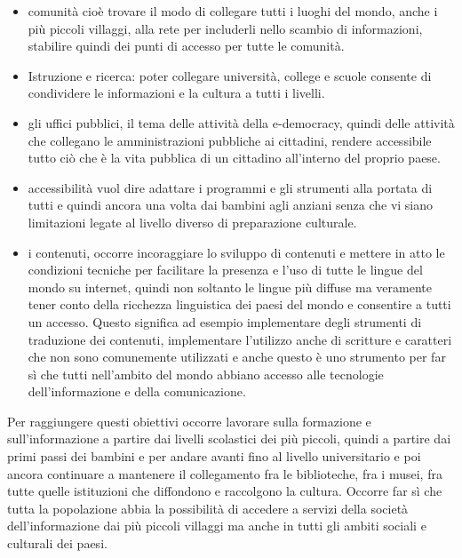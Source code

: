 \begin{itemize}
    \item comunità cioè trovare il modo di collegare tutti i luoghi del mondo, anche i più piccoli villaggi, alla rete per includerli nello scambio di informazioni, stabilire quindi dei punti di accesso per tutte le comunità.
    
    \item Istruzione e ricerca: poter collegare università, college e scuole consente di condividere le informazioni e la cultura a tutti i livelli.
    
    \item gli uffici pubblici, il tema delle attività della e-democracy, quindi delle attività che collegano le amministrazioni pubbliche ai cittadini, rendere accessibile tutto ciò che è la vita pubblica di un cittadino all'interno del proprio paese.
    
    \item accessibilità vuol dire adattare i programmi e gli strumenti alla portata di tutti e quindi ancora una volta dai bambini agli anziani senza che vi siano limitazioni legate al livello diverso di preparazione culturale.
    
    \item i contenuti, occorre incoraggiare lo sviluppo di contenuti e mettere in atto le condizioni tecniche per facilitare la presenza e l'uso di tutte le lingue del mondo su internet, quindi non soltanto le lingue più diffuse ma veramente tener conto della ricchezza linguistica dei paesi del mondo e consentire a tutti un accesso. Questo significa ad esempio implementare degli strumenti di traduzione dei contenuti, implementare l'utilizzo anche di scritture e caratteri che non sono comunemente utilizzati e anche questo è uno strumento per far sì che tutti nell'ambito del mondo abbiano accesso alle tecnologie dell'informazione e della comunicazione.
\end{itemize}

Per raggiungere questi obiettivi occorre lavorare sulla formazione e sull'informazione a partire dai livelli scolastici dei più piccoli, quindi a partire dai primi passi dei bambini e per andare avanti fino al livello universitario e poi ancora continuare a mantenere il collegamento fra le biblioteche, fra i musei, fra tutte quelle istituzioni che diffondono e raccolgono la cultura.
Occorre far sì che tutta la popolazione abbia la possibilità di accedere a servizi della società dell'informazione dai più piccoli villaggi ma anche in tutti gli ambiti sociali e culturali dei paesi.


